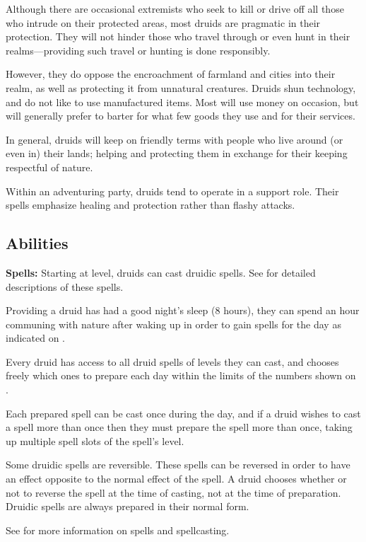 \begin{multicols*}{2}
Although there are occasional extremists who seek to kill or drive off all those who intrude on their protected areas, most druids are pragmatic in their protection. They will not hinder those who travel through or even hunt in their realms—providing such travel or hunting is done responsibly.

However, they do oppose the encroachment of farmland and cities into their realm, as well as protecting it from unnatural creatures. Druids shun technology, and do not like to use manufactured items. Most will use money on occasion, but will generally prefer to barter for what few goods they use and for their services.

In general, druids will keep on friendly terms with people who live around (or even in) their lands; helping and protecting them in exchange for their keeping respectful of nature.

Within an adventuring party, druids tend to operate in a support role. Their spells emphasize healing and protection rather than flashy attacks.

\subsection{Abilities}
\textbf{Spells:} Starting at  level, druids can cast druidic spells. See  for detailed descriptions of these spells.

Providing a druid has had a good night’s sleep (8 hours), they can spend an hour communing with nature after waking up in order to gain spells for the day as indicated on .

Every druid has access to all druid spells of levels they can cast, and chooses freely which ones to prepare each day within the limits of the numbers shown on .

Each prepared spell can be cast once during the day, and if a druid wishes to cast a spell more than once then they must prepare the spell more than once, taking up multiple spell slots of the spell’s level.

Some druidic spells are reversible. These spells can be reversed in order to have an effect opposite to the normal effect of the spell. A druid chooses whether or not to reverse the spell at the time of casting, not at the time of preparation. Druidic spells are always prepared in their normal form.

See  for more information on spells and spellcasting.


\end{multicols*}
